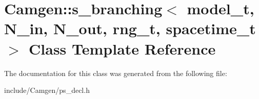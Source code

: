 \hypertarget{a00479}{\section{Camgen\-:\-:s\-\_\-branching$<$ model\-\_\-t, N\-\_\-in, N\-\_\-out, rng\-\_\-t, spacetime\-\_\-t $>$ Class Template Reference}
\label{a00479}
}


The documentation for this class was generated from the following file\-:\begin{DoxyCompactItemize}
\item 
include/\-Camgen/ps\-\_\-decl.\-h\end{DoxyCompactItemize}
